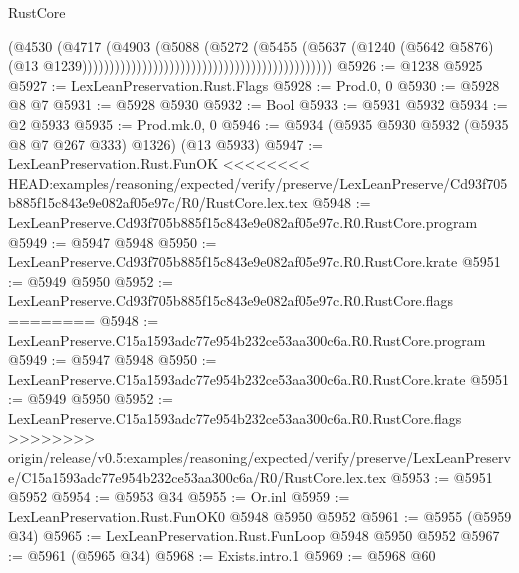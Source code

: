 \begin{lexlean}{RustCore}
\begin{coremodule}
{\begin{coremodule}
{{{{{{{{{{{{{{{{{{{{{{{{{{{{{{{{{{{{{{{{{{{{{                                                                              (@4530
                                                                                (@4717
                                                                                  (@4903
                                                                                    (@5088
                                                                                      (@5272
                                                                                        (@5455
                                                                                          (@5637
                                                                                            (@1240
                                                                                              (@5642
                                                                                                @5876)
                                                                                              (@13
                                                                                                @1239))))))))))))))))))))))))))))))))))))))))))))))
@5926 := @1238 @5925
@5927 := LexLeanPreservation.Rust.Flags
@5928 := Prod.{0, 0}
@5930 := @5928 @8 @7
@5931 := @5928 @5930
@5932 := Bool
@5933 := @5931 @5932
@5934 := @2 @5933
@5935 := Prod.mk.{0, 0}
@5946 := @5934 (@5935 @5930 @5932 (@5935 @8 @7 @267 @333) @1326) (@13 @5933)
@5947 := LexLeanPreservation.Rust.FunOK
<<<<<<<< HEAD:examples/reasoning/expected/verify/preserve/LexLeanPreserve/Cd93f705b885f15c843e9e082af05e97c/R0/RustCore.lex.tex
@5948 := LexLeanPreserve.Cd93f705b885f15c843e9e082af05e97c.R0.RustCore.program
@5949 := @5947 @5948
@5950 := LexLeanPreserve.Cd93f705b885f15c843e9e082af05e97c.R0.RustCore.krate
@5951 := @5949 @5950
@5952 := LexLeanPreserve.Cd93f705b885f15c843e9e082af05e97c.R0.RustCore.flags
========
@5948 := LexLeanPreserve.C15a1593adc77e954b232ce53aa300c6a.R0.RustCore.program
@5949 := @5947 @5948
@5950 := LexLeanPreserve.C15a1593adc77e954b232ce53aa300c6a.R0.RustCore.krate
@5951 := @5949 @5950
@5952 := LexLeanPreserve.C15a1593adc77e954b232ce53aa300c6a.R0.RustCore.flags
>>>>>>>> origin/release/v0.5:examples/reasoning/expected/verify/preserve/LexLeanPreserve/C15a1593adc77e954b232ce53aa300c6a/R0/RustCore.lex.tex
@5953 := @5951 @5952
@5954 := @5953 @34
@5955 := Or.inl
@5959 := LexLeanPreservation.Rust.FunOK0 @5948 @5950 @5952
@5961 := @5955 (@5959 @34)
@5965 := LexLeanPreservation.Rust.FunLoop @5948 @5950 @5952
@5967 := @5961 (@5965 @34)
@5968 := Exists.intro.{1}
@5969 := @5968 @60
}}}}}}}}}}}}}}}}}}}}}}}}}}}}}}}}}}}}}}}}}}}}}
\end{coremodule}}
\end{coremodule}
\end{lexlean}
